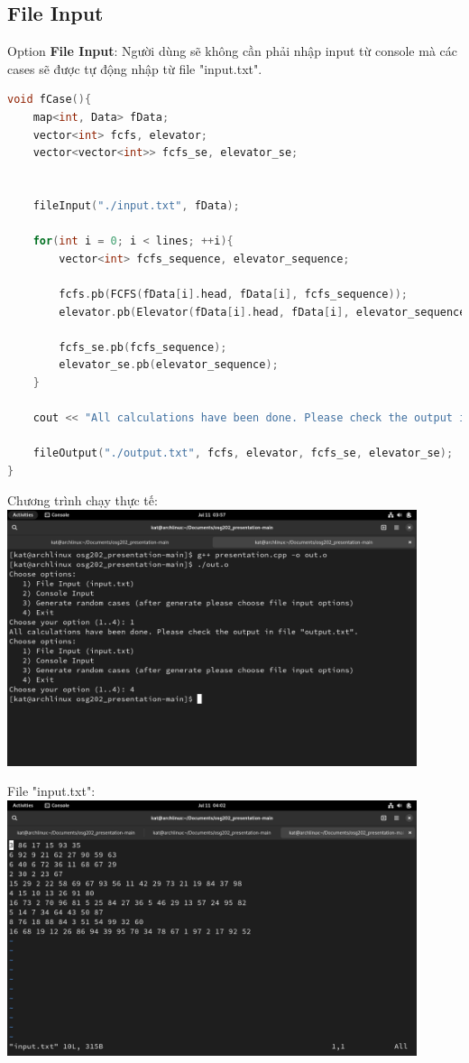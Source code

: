 \documentclass{report}
\begin{document}
        \subsection{File Input}
            Option \textbf{File Input}: Người dùng sẽ không cần phải nhập input từ console mà các cases sẽ được tự động nhập từ file "input.txt".
        
            \begin{lstlisting}[language=C++, caption=File Input Function]
void fCase(){
    map<int, Data> fData;
    vector<int> fcfs, elevator;
    vector<vector<int>> fcfs_se, elevator_se;


    fileInput("./input.txt", fData);
    
    for(int i = 0; i < lines; ++i){
        vector<int> fcfs_sequence, elevator_sequence;
        
        fcfs.pb(FCFS(fData[i].head, fData[i], fcfs_sequence));
        elevator.pb(Elevator(fData[i].head, fData[i], elevator_sequence));

        fcfs_se.pb(fcfs_sequence);
        elevator_se.pb(elevator_sequence);
    }

    cout << "All calculations have been done. Please check the output in file \"output.txt\"." << endl;
    
    fileOutput("./output.txt", fcfs, elevator, fcfs_se, elevator_se);
}
            \end{lstlisting}

            Chương trình chạy thực tế: \\
            \includegraphics[width = 12cm]{images/fileinput.png}

            File "input.txt":\\
            \includegraphics[width=12cm]{images/randominputtxt.png}
\end{document}
